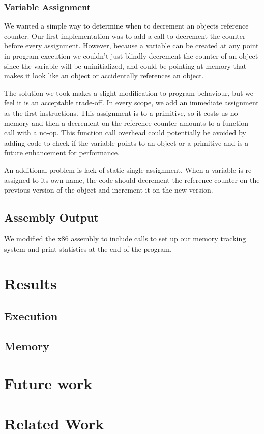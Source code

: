 \documentclass{sigplanconf}
\begin{document}
\subsubsection{Variable Assignment}
We wanted a simple way to determine when to decrement an objects reference counter.  Our first implementation was to add a call to decrement the counter before every assignment.  However, because a variable can be created at any point in program execution we couldn't just blindly decrement the counter of an object since the variable will be uninitialized, and could be pointing at memory that makes it look like an object or accidentally references an object.
\par
The solution we took makes a slight modification to program behaviour, but we feel it is an acceptable trade-off.  In every scope, we add an immediate assignment as the first instructions.  This assignment is to a primitive, so it costs us no memory and then a decrement on the reference counter amounts to a function call with a no-op.  This function call overhead could potentially be avoided by adding code to check if the variable points to an object or a primitive and is a future enhancement for performance.
\par
An additional problem is lack of static single assignment.  When a variable is re-assigned to its own name, the code should decrement the reference counter on the previous version of the object and increment it on the new version.
\subsection{Assembly Output}
We modified the x86 assembly to include calls to set up our memory tracking system and print statistics at the end of the program.
\section{Results}
\subsection{Execution}
\subsection{Memory}
\section{Future work}
\section{Related Work}
\appendix
\end{document}
